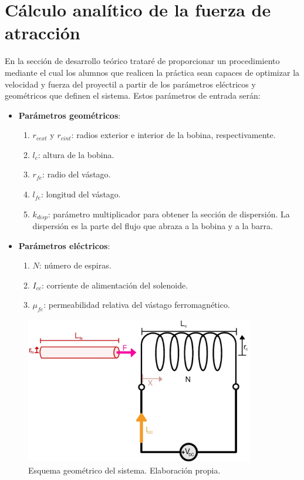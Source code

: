 \section{Cálculo analítico de la fuerza de atracción}
\label{sec:analitico}
En la sección de desarrollo teórico trataré de proporcionar un procedimiento mediante el cual los alumnos que realicen la práctica sean capaces de optimizar la velocidad y fuerza del proyectil a partir de los parámetros eléctricos y geométricos que definen el sistema. Estos parámetros de entrada serán:
\begin{itemize}
    \item \textbf{Parámetros geométricos}:
    \begin{enumerate}[label=\alph*., leftmargin=*, itemindent=1em]
        \item \(r_{cext}\) y \(r_{cint} \): radios exterior e interior de la bobina, respectivamente.
        \item \(l_c\): altura de la bobina.
        \item \(r_{fe}\): radio del vástago.
        \item \(l_{fe}\): longitud del vástago.
        \item \(k_{disp}\): parámetro multiplicador para obtener la sección de dispersión. La dispersión es la parte del flujo que abraza a la bobina y a la barra.
    \end{enumerate}
    \item \textbf{Parámetros eléctricos}:
    \begin{enumerate}[label=\alph*., leftmargin=*, itemindent=1em]
        \item \(N\): número de espiras.
        \item \(I_{cc}\): corriente de alimentación del solenoide.
        \item \(\mu_{fe}\): permeabilidad relativa del vástago ferromagnético.
    \end{enumerate}
\end{itemize}

\begin{figure}[H]
    \centering 
    \includegraphics[width=10cm]{FigurasMemoria/esquemaDesTeor.jpg}
    \caption{Esquema geométrico del sistema. Elaboración propia.}
    \label{fig:esquemaDesTeor} %
\end{figure}

